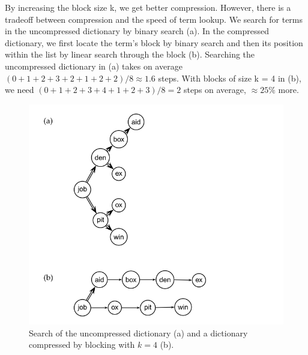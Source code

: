 \documentclass[letterpaper,11pt]{article}
\begin{document}
By increasing the block size k, we get better compression. However, there is a tradeoff between compression and the speed of term lookup. We search for terms in the uncompressed dictionary by binary search (a). In the compressed dictionary, we first locate the term’s block by binary search and then its position within the list by linear search through the block (b). Searching the uncompressed dictionary in (a) takes on average $(0 + 1 + 2 + 3 + 2 + 1 + 2 + 2)/8\approx1.6$ steps. With blocks of size k = 4 in (b), we need $(0+1+2+3+4+1+2+3)/8 = 2$ steps on average, $\approx25\%$ more.
\begin{figure}[H]
    \centering
    \includegraphics[scale=0.55]{sect5/figure_5_6.png}
    \caption{Search of the uncompressed dictionary (a) and a dictionary compressed by blocking with $k = 4$ (b).}
\end{figure}
\end{document}

